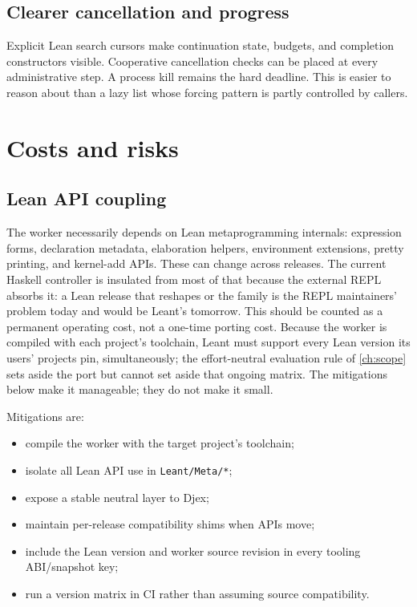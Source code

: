 \documentclass[10pt,letterpaper,oneside]{report}
\newcommand{\code}[1]{\texttt{\detokenize{#1}}}
\newcommand{\filepath}[1]{\nolinkurl{#1}}
\begin{document}
\subsection{Clearer cancellation and progress}

Explicit Lean search cursors make continuation state, budgets, and completion constructors visible. Cooperative cancellation checks can be placed at every administrative step. A process kill remains the hard deadline. This is easier to reason about than a lazy list whose forcing pattern is partly controlled by callers.

\section{Costs and risks}

\subsection{Lean API coupling}

The worker necessarily depends on Lean metaprogramming internals: expression forms, declaration metadata, elaboration helpers, environment extensions, pretty printing, and kernel-add APIs. These can change across releases. The current Haskell controller is insulated from most of that because the external REPL absorbs it: a Lean release that reshapes \code{Environment} or the \code{addDecl} family is the REPL maintainers' problem today and would be Leant's tomorrow. This should be counted as a permanent operating cost, not a one-time porting cost. Because the worker is compiled with each project's toolchain, Leant must support every Lean version its users' projects pin, simultaneously; the effort-neutral evaluation rule of \autoref{ch:scope} sets aside the port but cannot set aside that ongoing matrix. The mitigations below make it manageable; they do not make it small.

Mitigations are:

\begin{itemize}
  \item compile the worker with the target project's toolchain;
  \item isolate all Lean API use in \filepath{Leant/Meta/*};
  \item expose a stable neutral layer to Djex;
  \item maintain per-release compatibility shims when APIs move;
  \item include the Lean version and worker source revision in every tooling ABI/snapshot key;
  \item run a version matrix in CI rather than assuming source compatibility.
\end{itemize}
\end{document}
